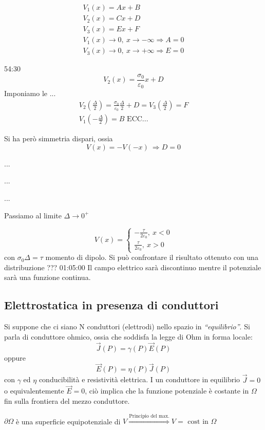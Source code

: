 \begin{align*}
V_1(x) = Ax+B \\
V_2(x) = Cx+D \\
V_3(x) = Ex + F \\
V_1(x) \to 0, \ x\to -\infty \Rightarrow A = 0 \\
V_3(x) \to 0, \ x\to +\infty \Rightarrow E = 0 
\end{align*}

54:30
$$
V_2(x) = \frac{\sigma_0}{\varepsilon_0}x + D
$$
Imponiamo le ...
\begin{align*}
V_2(\frac{\Delta}{2}) = \frac{\sigma_0}{\varepsilon_0} \frac{\Delta}{2} + D = V_3(\frac{\Delta}{2}) = F\\
V_1(-\frac{\Delta}{2}) = B \text{ ECC...}
\end{align*}

Si ha però simmetria dispari, ossia 
$$
V(x) = - V(-x) \ \Rightarrow D = 0
$$

...

...

...

Passiamo al limite $\Delta \to 0^+$

$$
V(x) = \begin{cases}
-\frac{\tau}{2\varepsilon_0},\ x < 0 \\
\frac{\tau}{2\varepsilon_0},\ x > 0
\end{cases}
$$
con $\sigma_0 \Delta = \tau $ momento di dipolo.
Si può confrontare il risultato ottenuto con una distribuzione ??? 01:05:00
Il campo elettrico sarà discontinuo mentre il potenziale sarà una funzione continua.

\subsection{Elettrostatica in presenza di conduttori}
Si suppone che ci siano N conduttori (elettrodi) nello spazio in \textit{``equilibrio''}.
Si parla di conduttore ohmico, ossia che soddisfa la legge di Ohm in forma locale:
$$
\vec{J}(P) = \gamma(P)\vec{E}(P)
$$
oppure
$$
\vec{E}(P) = \eta(P)\vec{J}(P)
$$
con $\gamma$ ed $\eta$ conducibilità e resistività elettrica.
I un conduttore in equilibrio $\vec{J} = 0$ o equivalentemente $\vec{E} = 0$, ciò implica 
che la funzione potenziale è costante in $\Omega$ fin sulla frontiera del mezzo conduttore.

$\partial \Omega$ è una superficie equipotenziale di $V \stackrel{\text{Principio del max.}}{\Rightarrow} V = \text{ cost in } \Omega$

